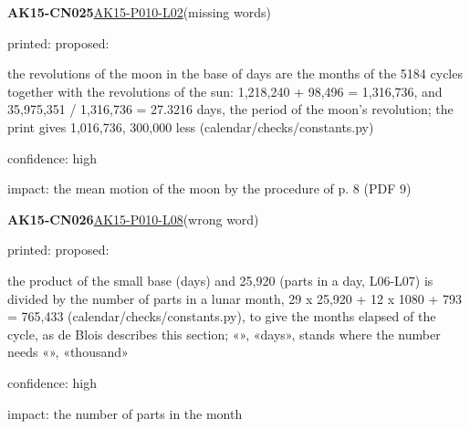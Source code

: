 \documentclass[11pt]{article}
\begin{document}
\noindent\textbf{AK15-CN025}\enspace\hyperlink{AK15-P010-L02}{AK15-P010-L02}\enspace(missing words)\par\noindent printed: \enspace proposed: \par\noindent the revolutions of the moon in the base of days are the months of the 5184 cycles together with the revolutions of the sun: 1,218,240 + 98,496 = 1,316,736, and 35,975,351 / 1,316,736 = 27.3216 days, the period of the moon's revolution; the print gives 1,016,736, 300,000 less (calendar/checks/constants.py)\par\noindent confidence: high\par\noindent impact: the mean motion of the moon by the procedure of p. 8 (PDF 9)\par\medskip
\noindent\textbf{AK15-CN026}\enspace\hyperlink{AK15-P010-L08}{AK15-P010-L08}\enspace(wrong word)\par\noindent printed: \enspace proposed: \par\noindent the product of the small base (days) and 25,920 (parts in a day, L06-L07) is divided by the number of parts in a lunar month, 29 x 25,920 + 12 x 1080 + 793 = 765,433 (calendar/checks/constants.py), to give the months elapsed of the cycle, as de Blois describes this section; «», «days», stands where the number needs «», «thousand»\par\noindent confidence: high\par\noindent impact: the number of parts in the month\par\medskip
\end{document}
